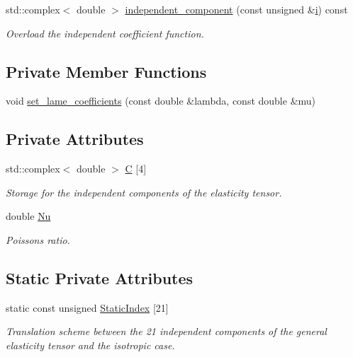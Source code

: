 \begin{DoxyCompactItemize}
std\+::complex$<$ double $>$ \hyperlink{classoomph_1_1PMLTimeHarmonicIsotropicElasticityTensor_a650332deea93cd5838fc614ac253ec1c}{independent\+\_\+component} (const unsigned \&\hyperlink{cfortran_8h_adb50e893b86b3e55e751a42eab3cba82}{i}) const
\begin{DoxyCompactList}\small\item\em Overload the independent coefficient function. \end{DoxyCompactList}\end{DoxyCompactItemize}
\subsection*{Private Member Functions}
\begin{DoxyCompactItemize}
\item 
void \hyperlink{classoomph_1_1PMLTimeHarmonicIsotropicElasticityTensor_ae0b7edb4584cac4bfdf2cf9b74486a23}{set\+\_\+lame\+\_\+coefficients} (const double \&lambda, const double \&mu)
\end{DoxyCompactItemize}
\subsection*{Private Attributes}
\begin{DoxyCompactItemize}
\item 
std\+::complex$<$ double $>$ \hyperlink{classoomph_1_1PMLTimeHarmonicIsotropicElasticityTensor_ab577ccf1c4b74e02a287461649b5198e}{C} \mbox{[}4\mbox{]}
\begin{DoxyCompactList}\small\item\em Storage for the independent components of the elasticity tensor. \end{DoxyCompactList}\item 
double \hyperlink{classoomph_1_1PMLTimeHarmonicIsotropicElasticityTensor_a6515ab800426cca35c724f8d7f96e681}{Nu}
\begin{DoxyCompactList}\small\item\em Poisson\textquotesingle{}s ratio. \end{DoxyCompactList}\end{DoxyCompactItemize}
\subsection*{Static Private Attributes}
\begin{DoxyCompactItemize}
\item 
static const unsigned \hyperlink{classoomph_1_1PMLTimeHarmonicIsotropicElasticityTensor_ac1c39fcce5b79af772e89e86def6f623}{Static\+Index} \mbox{[}21\mbox{]}
\begin{DoxyCompactList}\small\item\em Translation scheme between the 21 independent components of the general elasticity tensor and the isotropic case. \end{DoxyCompactList}\end{DoxyCompactItemize}
